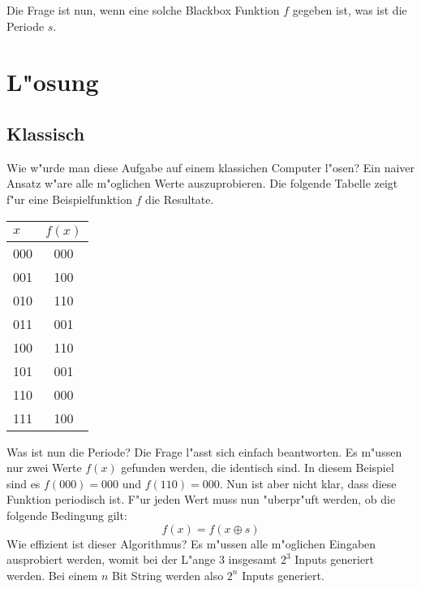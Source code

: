 \begin{refsection}
\begin{figure}[H]
\end{figure}
Die Frage ist nun, wenn eine solche Blackbox Funktion $f$ gegeben ist, was ist die
Periode $s$. 
\section{L"osung}

\subsection{Klassisch}

Wie w"urde man diese Aufgabe auf einem klassichen Computer l"osen? Ein naiver
Ansatz w"are alle m"oglichen Werte auszuprobieren. Die folgende Tabelle zeigt
f"ur eine Beispielfunktion $f$ die Resultate.
\begin{center}
   \begin{tabular}{ l | c  }
    \hline
     $x$   & $f(x)$ \\ \hline
     000 & 000  \\ \hline
     001 & 100  \\ \hline
     010 & 110  \\ \hline
     011 & 001  \\ \hline
     100 & 110  \\ \hline
     101 & 001  \\ \hline
     110 & 000  \\ \hline
     111 & 100  \\ \hline
     \hline
    \end{tabular}
\end{center}
Was ist nun die Periode? Die Frage l"asst sich einfach beantworten. Es m"ussen
nur zwei Werte $f(x)$ gefunden werden, die identisch sind. In diesem Beispiel
sind es $f(000) = 000$ und $f(110) = 000$. 
Nun ist aber nicht klar, dass diese Funktion periodisch ist. F"ur jeden Wert
muss nun "uberpr"uft werden, ob die folgende Bedingung gilt:
\[
    f(x) = f(x \oplus s) 
\]
Wie effizient ist dieser Algorithmus? Es m"ussen alle m"oglichen Eingaben
ausprobiert werden, womit bei der L"ange $3$ insgesamt $2^3$ Inputs generiert
werden. Bei einem $n$ Bit String werden also $2^n$ Inputs generiert. 


\end{refsection}

